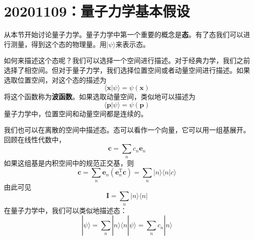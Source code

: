 \documentclass[12pt]{article}
\begin{document}
\section{20201109：量子力学基本假设}

    从本节开始讨论量子力学。量子力学中第一个重要的概念是\textbf{态}。有了态我们可以进行测量，得到这个态的物理量。用$| \psi \rangle$来表示态。

    如何来描述这个态呢？我们可以选择一个空间进行描述。对于经典力学，我们之前选择了相空间。但对于量子力学，我们选择位置空间或者动量空间进行描述。如果选取位置空间，对这个态的描述为
    \begin{equation}
        \langle \bm{x} | \psi \rangle = \psi(\bm{x})
    \end{equation}
    将这个函数称为\textbf{波函数}。如果选取动量空间，类似地可以描述为
    \begin{equation}
        \langle \bm{p} | \psi \rangle = \psi(\bm{p})
    \end{equation}
    量子力学中，位置空间和动量空间都是连续的。

    我们也可以在离散的空间中描述态。态可以看作一个向量，它可以用一组基展开。回顾在线性代数中，
    \begin{equation}
        \bm{c} = \sum_n c_n \bm{e}_n
    \end{equation}
    如果这组基是内积空间中的规范正交基，则
    \begin{equation}
        \bm{c} = \sum_n \bm{e}_n (\bm{e}_n^\mathrm{T}\bm{c}) 
        = \sum_n |n\rangle \langle n|c\rangle
    \end{equation}
    由此可见
    \begin{equation}
        \bm{I} = \sum_n |n\rangle \langle n|
    \end{equation}
    在量子力学中，我们可以类似地描述态：
    \begin{equation}
        |\psi \rangle = \sum_n |n\rangle \langle n|\psi \rangle = \sum_n c_n |n\rangle
    \end{equation}
\end{document}
